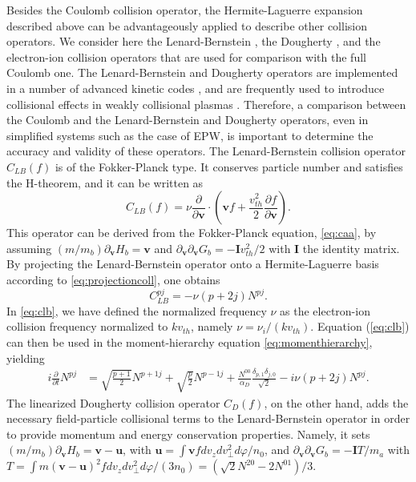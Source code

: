 Besides the Coulomb collision operator, the Hermite-Laguerre expansion described above can be advantageously applied to  describe other collision operators.
%
We consider here the Lenard-Bernstein \citep{Lenard1958}, the Dougherty \citep{Dougherty1964}, and the electron-ion collision operators that are used for comparison with the {full} Coulomb one.
%
The Lenard-Bernstein and Dougherty operators are implemented in a number of advanced kinetic codes \citep{Nakata2016,Grandgirard2016,Pan2018}, and are frequently used to introduce collisional effects in weakly collisional plasmas \citep{Zocco2011,Zocco2015,Shi2017,Mandell2018}.
%
Therefore, a comparison between the Coulomb and the Lenard-Bernstein and Dougherty operators, even in simplified systems such as the case of EPW, is important to determine the accuracy and validity of these operators.
%
The Lenard-Bernstein collision operator $C_{LB}(f)$ is of the Fokker-Planck type.
%
It conserves particle number and satisfies the H-theorem, and it can be written as \citep{Lenard1958}
%
\begin{equation}
    C_{LB}(f) = \nu \frac{\partial}{\partial \mathbf v} \cdot \left(\mathbf v f + \frac{v_{th}^2}{2}\frac{\partial f}{\partial \mathbf v}\right).
\label{eq:LBoperator}
\end{equation}
%
This operator can be derived from the Fokker-Planck equation, \cref{eq:caa}, by assuming $(m/m_b)\partial_{\mathbf v} H_b = \mathbf v$ and $\partial_{\mathbf v}\partial_{\mathbf v}G_b  = -\mathbf I v_{th}^2/2$ with $\mathbf I$ the identity matrix.
%
By projecting the Lenard-Bernstein operator onto a Hermite-Laguerre basis according to \cref{eq:projectioncoll}, one obtains
%
\begin{equation}
    C_{LB}^{pj} = - \nu (p+2j) N^{pj}.
\label{eq:clb}
\end{equation}
%
In \cref{eq:clb}, we have defined the normalized frequency $\nu$ as the electron-ion collision frequency normalized to $k v_{th}$, namely $\nu = \nu_i/(k v_{th})$.
%
Equation (\ref{eq:clb}) can then be used in the moment-hierarchy equation \cref{eq:momenthierarchy}, yielding
%
\begin{align}
    i \frac{\partial}{\partial t} N^{pj} &= \sqrt{\frac{p+1}{2}}N^{p+1 j}+\sqrt{\frac{p}{2}}N^{p-1 j}+ \frac{N^{00}}{\alpha_D}\frac{\delta_{p,1}\delta_{j,0}}{\sqrt{2}}-i\nu (p+2j) N^{pj}.
\label{eq:lbmomenthierarchy}
\end{align}
%
The linearized Dougherty collision operator $C_D(f)$, on the other hand, adds the necessary field-particle collisional terms to the Lenard-Bernstein operator in order to provide momentum and energy conservation properties. Namely, it sets $(m/m_b)\partial_{\mathbf v} H_b = \mathbf v-\mathbf u$, with $\mathbf u = \int \mathbf v f dv_z dv_\perp^2 d\varphi/n_0$, and $\partial_{\mathbf v}\partial_{\mathbf v}G_b  = -\mathbf I T/m_a$ with $T=\int m (\mathbf v-\mathbf u)^2 f dv_z dv_\perp^2 d\varphi/(3 n_0)=(\sqrt{2}N^{20}-2N^{01})/3$.
